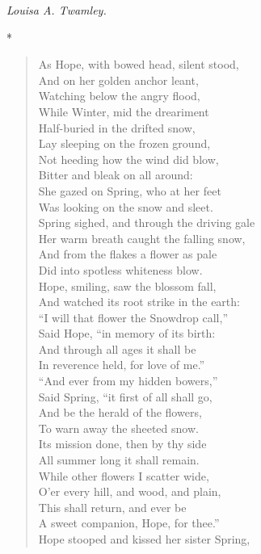 \documentclass[11pt,twoside]{article}
\newcommand\stars{\begin{center}*\quad*\quad*\end{center}}
\newcommand\by[1]{\par\hfill\textit{#1}\par}
\begin{document}
\by{Louisa A. Twamley.}

\stars

\begin{verse}
As Hope, with bowed head, silent stood,\\
\quad And on her golden anchor leant,\\
Watching below the angry flood,\\
\quad While Winter, mid the dreariment\\
Half-buried in the drifted snow,\\
\quad Lay sleeping on the frozen ground,\\
Not heeding how the wind did blow,\\
\quad Bitter and bleak on all around:\\
She gazed on Spring, who at her feet\\
Was looking on the snow and sleet.\\
Spring sighed, and through the driving gale\\
\quad Her warm breath caught the falling snow,\\
And from the flakes a flower as pale\\
\quad Did into spotless whiteness blow.\\
Hope, smiling, saw the blossom fall,\\
\quad And watched its root strike in the earth:\\
“I will that flower the Snowdrop call,”\\
\quad Said Hope, “in memory of its birth:\\
And through all ages it shall be\\
In reverence held, for love of me.”\\
“And ever from my hidden bowers,”\\
\quad Said Spring, “it first of all shall go,\\
And be the herald of the flowers,\\
\quad To warn away the sheeted snow.\\
Its mission done, then by thy side\\
\quad All summer long it shall remain.\\
While other flowers I scatter wide,\\
\quad O’er every hill, and wood, and plain,\\
This shall return, and ever be\\
A sweet companion, Hope, for thee.”\\
Hope stooped and kissed her sister Spring,\\

\end{verse}
\end{document}
